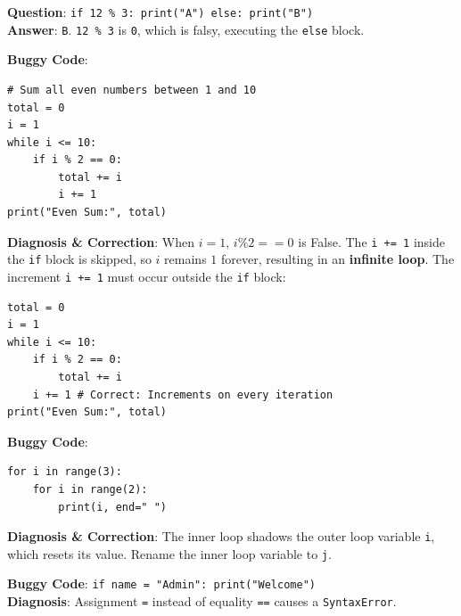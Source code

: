 \begin{outputprediction}
\textbf{Question}: \texttt{if 12 \% 3: print("A") else: print("B")} \\
\textbf{Answer}: \texttt{B}. \texttt{12 \% 3} is \texttt{0}, which is falsy, executing the \texttt{else} block.
\end{outputprediction}

\begin{debuggingbox}
\textbf{Buggy Code}:
\begin{lstlisting}[language=Python3]
# Sum all even numbers between 1 and 10
total = 0
i = 1
while i <= 10:
    if i % 2 == 0:
        total += i
        i += 1
print("Even Sum:", total)
\end{lstlisting}
\textbf{Diagnosis \& Correction}:
When $i=1$, $i\%2 == 0$ is False. The \texttt{i += 1} inside the \texttt{if} block is skipped, so $i$ remains $1$ forever, resulting in an \textbf{infinite loop}. The increment \texttt{i += 1} must occur outside the \texttt{if} block:
\begin{lstlisting}[language=Python3]
total = 0
i = 1
while i <= 10:
    if i % 2 == 0:
        total += i
    i += 1 # Correct: Increments on every iteration
print("Even Sum:", total)
\end{lstlisting}
\end{debuggingbox}

\begin{debuggingbox}
\textbf{Buggy Code}:
\begin{lstlisting}[language=Python3]
for i in range(3):
    for i in range(2):
        print(i, end=" ")
\end{lstlisting}
\textbf{Diagnosis \& Correction}: The inner loop shadows the outer loop variable \texttt{i}, which resets its value. Rename the inner loop variable to \texttt{j}.
\end{debuggingbox}

\begin{debuggingbox}
\textbf{Buggy Code}: \texttt{if name = "Admin": print("Welcome")} \\
\textbf{Diagnosis}: Assignment \texttt{=} instead of equality \texttt{==} causes a \texttt{SyntaxError}.
\end{debuggingbox}

